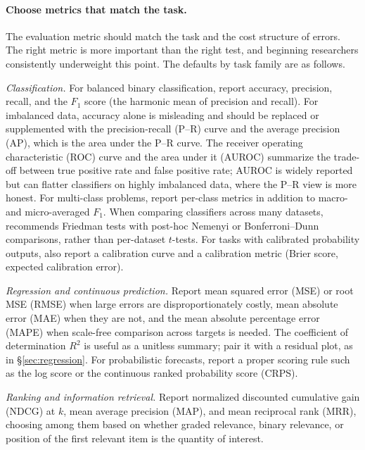 \documentclass[11pt]{article}
\begin{document}
\paragraph{Choose metrics that match the task.} The evaluation metric should match the task and the cost structure of errors. The right metric is more important than the right test, and beginning researchers consistently underweight this point. The defaults by task family are as follows.

\textit{Classification.} For balanced binary classification, report accuracy, precision, recall, and the $F_1$ score (the harmonic mean of precision and recall). For imbalanced data, accuracy alone is misleading and should be replaced or supplemented with the precision-recall (P--R) curve and the average precision (AP), which is the area under the P--R curve. The receiver operating characteristic (ROC) curve and the area under it (AUROC) summarize the trade-off between true positive rate and false positive rate; AUROC is widely reported but can flatter classifiers on highly imbalanced data, where the P--R view is more honest. For multi-class problems, report per-class metrics in addition to macro- and micro-averaged $F_1$. When comparing classifiers across many datasets, \citet{demsar2006statistical} recommends Friedman tests with post-hoc Nemenyi or Bonferroni--Dunn comparisons, rather than per-dataset $t$-tests. For tasks with calibrated probability outputs, also report a calibration curve and a calibration metric (Brier score, expected calibration error).

\textit{Regression and continuous prediction.} Report mean squared error (MSE) or root MSE (RMSE) when large errors are disproportionately costly, mean absolute error (MAE) when they are not, and the mean absolute percentage error (MAPE) when scale-free comparison across targets is needed. The coefficient of determination $R^2$ is useful as a unitless summary; pair it with a residual plot, as in \S\ref{sec:regression}. For probabilistic forecasts, report a proper scoring rule such as the log score or the continuous ranked probability score (CRPS).

\textit{Ranking and information retrieval.} Report normalized discounted cumulative gain (NDCG) at $k$, mean average precision (MAP), and mean reciprocal rank (MRR), choosing among them based on whether graded relevance, binary relevance, or position of the first relevant item is the quantity of interest.
\end{document}
